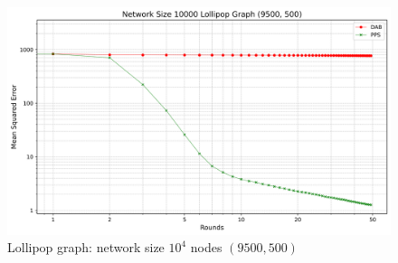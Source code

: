 \begin{figure}[H]
    \centering
    \includegraphics[scale=0.5]{figures/lollipopGraphSimulations/9500+500/DAB_vs_PPS_LG_r50_n10000.png}
    \caption{Lollipop graph: network size $10^{4}$ nodes $(9500, 500)$}
    \label{fig:9500+500lollipopgraph}
\end{figure}